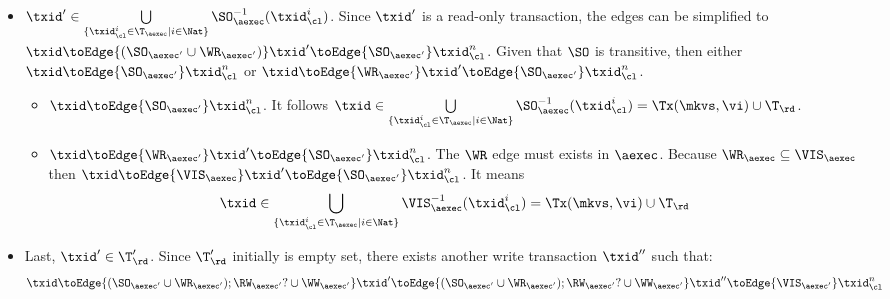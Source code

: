\begin{itemize}
\begin{itemize}
\begin{itemize}
        By the invariant \( I_1 \), it means \( \txid \in \Tx(\mkvs, \vi) \cup \T_\rd \).
    \item \( \txid' \in \bigcup\limits_{\{\txid_{\cl}^{i} \in \T_{\aexec} \mid i \in \Nat\}} \SO_{\aexec}^{-1}(\txid^i_\cl) \).
    Since \( \txid' \) is a read-only transaction, 
    the edges can be simplified to \( \txid \toEdge{(\SO_{\aexec'} \cup \WR_{\aexec'} )} \txid' \toEdge{\SO_{\aexec'}}  \txid_\cl^n \).
    Given that \( \SO \) is transitive, then  either \( \txid \toEdge{\SO_{\aexec'}} \txid_\cl^n \) or \( \txid \toEdge{\WR_{\aexec'} } \txid' \toEdge{\SO_{\aexec'}}  \txid_\cl^n \).
    \begin{itemize}
        \item \( \txid \toEdge{\SO_{\aexec'}} \txid_\cl^n \).
            It follows \( \txid \in \bigcup\limits_{\{\txid_{\cl}^{i} \in \T_{\aexec} \mid i \in \Nat\}} \SO_{\aexec}^{-1}(\txid^i_\cl) = \Tx(\mkvs, \vi) \cup \T_\rd \).
        \item \( \txid \toEdge{\WR_{\aexec'} } \txid' \toEdge{\SO_{\aexec'}}  \txid_\cl^n \).
            The \( \WR \) edge must exists in \( \aexec \).
            Because \( \WR_\aexec \subseteq \VIS_\aexec \) then  \( \txid \toEdge{\VIS_{\aexec} } \txid' \toEdge{\SO_{\aexec'}}  \txid_\cl^n  \).
            It means 
            \[ 
                \txid \in \bigcup\limits_{\{\txid_{\cl}^{i} \in \T_{\aexec} \mid i \in \Nat\}} \VIS_{\aexec}^{-1}(\txid^i_\cl) = \Tx(\mkvs, \vi) \cup \T_\rd 
            \]
    \end{itemize}
    \item 
    Last, \( \txid' \in \T'_\rd \).
    Since \( \T'_\rd \) initially is empty set, there exists another write transaction \( \txid'' \) such that:
    \[
        \txid \toEdge{(\SO_{\aexec'} \cup \WR_{\aexec'} ) ; \RW_{\aexec'}? \cup \WW_{\aexec'}} \txid' \toEdge{(\SO_{\aexec'} \cup \WR_{\aexec'} ) ; \RW_{\aexec'}? \cup \WW_{\aexec'}} \txid'' \toEdge{\VIS_{\aexec'}}  \txid_\cl^n
    \]

\end{itemize}
\end{itemize}
\end{itemize}

